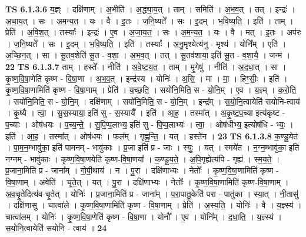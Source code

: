 \documentclass[17pt]{extarticle}
\begin{document}
                                \textbf{ TS 6.1.3.6} \newline
                  य॒ज्ञ्ः । दक्षि॑णाम् । अ॒भीति॑ । अ॒द्ध्या॒य॒त् । ताम् । समिति॑ । अ॒भ॒व॒त् । तत् । इन्द्रः॑ । अ॒चा॒य॒त् । सः । अ॒म॒न्य॒त॒ । यः । वै । इ॒तः । ज॒नि॒ष्यते᳚ । सः । इ॒दम् । भ॒वि॒ष्य॒ति॒ । इति॑ । ताम् । प्रेति॑ । अ॒वि॒श॒त् । तस्याः᳚ । इन्द्रः॑ । ए॒व । अ॒जा॒य॒त॒ । सः । अ॒म॒न्य॒त॒ । यः । वै । मत् । इ॒तः । अप॑रः । ज॒नि॒ष्यते᳚ । सः । इ॒दम् । भ॒वि॒ष्य॒ति॒ । इति॑ । तस्याः᳚ । अ॒नु॒मृश्येत्य॑नु - मृश्य॑ । योनि᳚म् । एति॑ । अ॒च्छि॒न॒त् । सा । सू॒तव॒शेति॑ सू॒त - व॒शा॒ । अ॒भ॒व॒त् । तत् । सू॒तव॑शाया॒ इति॑ सू॒त - व॒शा॒यै॒ । जन्म॑ । \textbf{  22} \newline
                  \newline
                                \textbf{ TS 6.1.3.7} \newline
                  ताम् । हस्ते᳚ । नीति॑ । अ॒वे॒ष्ट॒य॒त॒ । ताम् । मृ॒गेषु॑ । नीति॑ । अ॒द॒धा॒त् । सा । कृ॒ष्ण॒वि॒षा॒णेति॑ कृष्ण - वि॒षा॒णा । अ॒भ॒व॒त् । इन्द्र॑स्य । योनिः॑ । अ॒सि॒ । मा । मा॒ । हिꣳ॒॒सीः॒ । इति॑ । कृ॒ष्ण॒वि॒षा॒णामिति॑ कृष्ण - वि॒षा॒णाम् । प्रेति॑ । य॒च्छ॒ति॒ । सयो॑नि॒मिति॒ स - यो॒नि॒म् । ए॒व । य॒ज्ञ्म् । क॒रो॒ति॒ । सयो॑नि॒मिति॒ स - यो॒नि॒म् । दक्षि॑णाम् । सयो॑नि॒मिति॒ स - यो॒नि॒म् । इन्द्र᳚म् । स॒यो॒नि॒त्वायेति॑ सयोनि-त्वाय॑ । कृ॒ष्यै । त्वा॒ । सु॒स॒स्याया॒ इति॑ सु - स॒स्यायै᳚ । इति॑ । आ॒ह॒ । तस्मा᳚त् । अ॒कृ॒ष्ट॒प॒च्या इत्य॑कृष्ट - प॒च्याः । ओष॑धयः । प॒च्य॒न्ते॒ । सु॒पि॒प्प॒लाभ्य॒ इति॑ सु - पि॒प्प॒लाभ्यः॑ । त्वा॒ । ओष॑धीभ्य॒ इत्योष॑धि - भ्यः॒ । इति॑ । आ॒ह॒ । तस्मा᳚त् । ओष॑धयः । फल᳚म् । गृ॒ह्ण॒न्ति॒ । यत् । हस्ते॑न । \textbf{  23} \newline
                  \newline
                                \textbf{ TS 6.1.3.8} \newline
                  क॒ण्डू॒येत॑ । पा॒म॒न॒म्भावु॑का॒ इति॑ पामनम् - भावु॑काः । प्र॒जा इति॑ प्र - जाः । स्युः॒ । यत् । स्मये॑त । न॒ग्न॒म्भावु॑का॒ इति॑ नग्नम् - भावु॑काः । कृ॒ष्ण॒वि॒षा॒णयेति॑ कृष्ण-वि॒षा॒णया᳚ । क॒ण्डू॒य॒ते॒ । अ॒पि॒गृह्येत्य॑पि - गृह्य॑ । स्म॒य॒ते॒ । प्र॒जाना॒मिति॑ प्र - जाना᳚म् । गो॒पी॒थाय॑ । न । पु॒रा । दक्षि॑णाभ्यः । नेतोः᳚ । कृ॒ष्ण॒वि॒षा॒णामिति॑ कृष्ण - वि॒षा॒णाम् । अवेति॑ । चृ॒ते॒त् । यत् । पु॒रा । दक्षि॑णाभ्यः । नेतोः᳚ । कृ॒ष्ण॒वि॒षा॒णामिति॑ कृष्ण-वि॒षा॒णाम् । अ॒व॒चृ॒तेदित्य॑व-चृ॒तेत् । योनिः॑ । प्र॒जाना॒मिति॑ प्र - जाना᳚म् । प॒रा॒पातु॒केति॑ परा - पातु॑का । स्या॒त् । नी॒तासु॑ । दक्षि॑णासु । चात्वा॑ले । कृ॒ष्ण॒वि॒षा॒णामिति॑ कृष्ण - वि॒षा॒णाम् । प्रेति॑ । अ॒स्य॒ति॒ । योनिः॑ । वै । य॒ज्ञ्स्य॑ । चात्वा॑लम् । योनिः॑ । कृ॒ष्ण॒वि॒षा॒णेति॑ कृष्ण - वि॒षा॒णा । योनौ᳚ । ए॒व । योनि᳚म् । द॒धा॒ति॒ । य॒ज्ञ्स्य॑ । स॒यो॒नि॒त्वायेति॑ सयोनि - त्वाय॑ ॥ \textbf{  24} \newline
\end{document}
